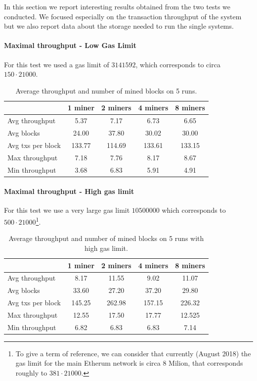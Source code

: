 In this section we report interesting results obtained from the two tests we
conducted. We focused especially on the transaction throughput of the system
but we also report data about the storage needed to run the single systems.

\paragraph{Maximal throughput - Low Gas Limit}
\label{sec:max-troughput}
For this test we used a gas limit of $3141592$, which corresponds to circa
$150 \cdot 21000$.

\begin{table}[h]
  \centering
  \begin{tabular}{l | cccc}
    & 1 miner & 2 miners & 4 miners & 8 miners \\ \hline
    Avg throughput & 5.37 & 7.17 & 6.73 & 6.65 \\
    Avg blocks & 24.00 & 37.80 & 30.02 & 30.00 \\
    Avg txs per block & 133.77 & 114.69 & 133.61 & 133.15 \\
    Max throughput & 7.18 & 7.76 & 8.17 & 8.67 \\
    Min throughput & 3.68 & 6.83 & 5.91 & 4.91 \\
  \end{tabular}
  \caption{Average throughput and number of mined blocks on 5 runs.}
  \label{tab:max-troughput}
\end{table}


\paragraph{Maximal throughput - High gas limit}
\label{sec:max-throughput-high-gaslimit}
For this test we use a very large gas limit $10500000$ which corresponds to
$500 \cdot 21000$\footnote{To give a term of reference, we can consider that
currently (August 2018) the gas limit for the main Etherum network is circa $8$
Milion, that corresponds roughly to $381 \cdot 21000$.}.

\begin{table}[h]
  \centering
  \begin{tabular}{l | cccc}
    & 1 miner & 2 miners & 4 miners & 8 miners \\ \hline
    Avg throughput & 8.17 & 11.55 & 9.02 & 11.07 \\
    Avg blocks & 33.60 & 27.20 & 37.20 & 29.80 \\
    Avg txs per block & 145.25 & 262.98 & 157.15 & 226.32  \\
    Max throughput & 12.55 & 17.50 & 17.77 & 12.525 \\
    Min throughput & 6.82 & 6.83 & 6.83 & 7.14 \\
  \end{tabular}
  \caption{Average throughput and number of mined blocks on 5 runs with high gas limit.}
  \label{tab:max-troughput-high-gaslimit}
\end{table}

